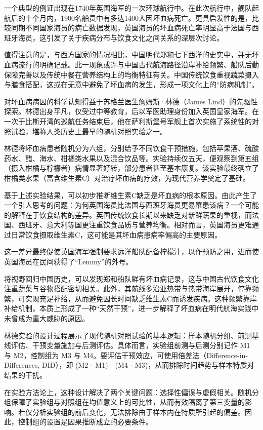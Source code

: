 一个典型的例证出现在1740年英国海军的一次环球航行中。在此次航行中，舰队起航后的十个月内，1900名船员中有多达1400人因坏血病死亡。更具启发性的是，比较同期不同国家海员的病亡数据发现，英国海员的坏血病死亡率明显高于法国与西班牙海员，这引发了关于疾病分布与饮食文化之间关系的深层次讨论。

值得注意的是，与西方国家的情况相比，中国明代郑和七下西洋的史实中，并无坏血病流行的明确记载。此一现象或许与中国古代航海路径沿岸补给频繁、船队后勤保障完善以及传统中餐在营养结构上的均衡特征有关。中国传统饮食重视蔬菜摄入与膳食搭配，这或在无意中避免了坏血病的发生，形成一项文化上的“防病机制”。

对坏血病病因的科学认知得益于苏格兰医生詹姆斯·林德（James Lind）的先驱性探索。林德出身平凡，仅受过中等教育，后以军医助理身份加入英国皇家海军。在一次于比斯开湾的巡航任务结束后，他在萨利斯堡号军舰上首次实施了系统性的对照试验，堪称人类历史上最早的随机对照实验之一。

林德将坏血病患者随机分为六组，分别给予不同饮食干预措施，包括苹果酒、硫酸药水、醋、海水、柑橘类水果以及混合饮品等。实验持续仅五天，便观察到第五组（摄入柑橘与柠檬者）病情显著好转，部分患者甚至基本康复。该实验最终确立了柑橘类水果（富含维生素C）对治疗坏血病的疗效，为现代营养学奠定了基础。

基于上述实验结果，可以初步推断维生素C缺乏是坏血病的根本原因。由此产生了一个引人思考的问题：为何英国海员比法国与西班牙海员更易罹患该病？一个可能的解释在于饮食结构的差异。英国传统饮食长期以来缺乏对新鲜蔬果的重视，而法国、西班牙、意大利等国更注重饮食品质与营养均衡。相对而言，英国海员更难通过日常饮食摄取维生素C，这可能是其坏血病患病率偏高的主要原因。

这一差异最终促使英国海军强制要求远洋船队配备柠檬汁，以作预防之用，进而使英国海员在民间获得了“Lemmy”的外号。

将视野回归中国历史，可以发现郑和船队鲜有坏血病记录，这与中国古代饮食文化注重蔬菜与谷物搭配密切相关。此外，其航线多沿亚热带与热带海岸展开，停靠频繁，可实现充足补给，从而避免因长时间缺乏维生素C而诱发疾病。这种频繁靠岸补给机制，本质上形成了一种“天然干预”，进一步解释了坏血病在明代航海实践中未曾成为重大威胁的原因。

林德实验的设计过程展示了现代随机对照试验的基本逻辑：样本随机分组、前测基线评估、干预变量施加与后测评估。具体而言，实验组前测与后测分别记作 M1 与 M2，控制组为 M3 与 M4。要评估干预效应，可使用倍差法（Difference-in-Differences, DID），即 (M2 - M1) - (M4 - M3)，从而排除时间趋势与样本特质对结果的干扰。

在实验方法论上，这种设计解决了两个关键问题：选择性偏误与虚假相关。随机分组保障了实验组与对照组在均值意义上的可比性，从而有效隔离了第三变量的影响。若仅分析实验组的前后变化，无法排除由于样本内在特质所引起的偏差。因此，控制组的设置是因果推断成立的必要条件。

